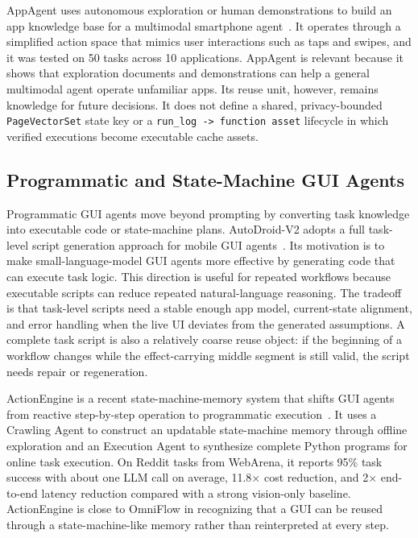 \documentclass[sigplan,10pt]{acmart}
\newcommand{\sysname}{OmniFlow\xspace}
\begin{document}
AppAgent uses autonomous exploration or human demonstrations to build an app
knowledge base for a multimodal smartphone agent~\cite{zhang2025appagent}. It
operates through a simplified action space that mimics user interactions such as
taps and swipes, and it was tested on 50 tasks across 10 applications. AppAgent
is relevant because it shows that exploration documents and demonstrations can
help a general multimodal agent operate unfamiliar apps. Its reuse unit,
however, remains knowledge for future decisions. It does not define a shared,
privacy-bounded \texttt{PageVectorSet} state key or a
\texttt{run\_log -> function asset} lifecycle in which verified executions
become executable cache assets.

\subsection{Programmatic and State-Machine GUI Agents}

Programmatic GUI agents move beyond prompting by converting task knowledge into
executable code or state-machine plans. AutoDroid-V2 adopts a full task-level
script generation approach for mobile GUI agents~\cite{autodroid-v2}. Its
motivation is to make small-language-model GUI agents more effective by
generating code that can execute task logic. This direction is useful for
repeated workflows because executable scripts can reduce repeated
natural-language reasoning. The tradeoff is that task-level scripts need a
stable enough app model, current-state alignment, and error handling when the
live UI deviates from the generated assumptions. A complete task script is also
a relatively coarse reuse object: if the beginning of a workflow changes while
the effect-carrying middle segment is still valid, the script needs repair or
regeneration.

ActionEngine is a recent state-machine-memory system that shifts GUI agents
from reactive step-by-step operation to programmatic
execution~\cite{zhong2026actionengine}. It uses a Crawling Agent to construct an
updatable state-machine memory through offline exploration and an Execution
Agent to synthesize complete Python programs for online task execution. On
Reddit tasks from WebArena, it reports 95\% task success with about one LLM call
on average, 11.8$\times$ cost reduction, and 2$\times$ end-to-end latency
reduction compared with a strong vision-only baseline. ActionEngine is close to
\sysname in recognizing that a GUI can be reused through a state-machine-like
memory rather than reinterpreted at every step.
\end{document}
